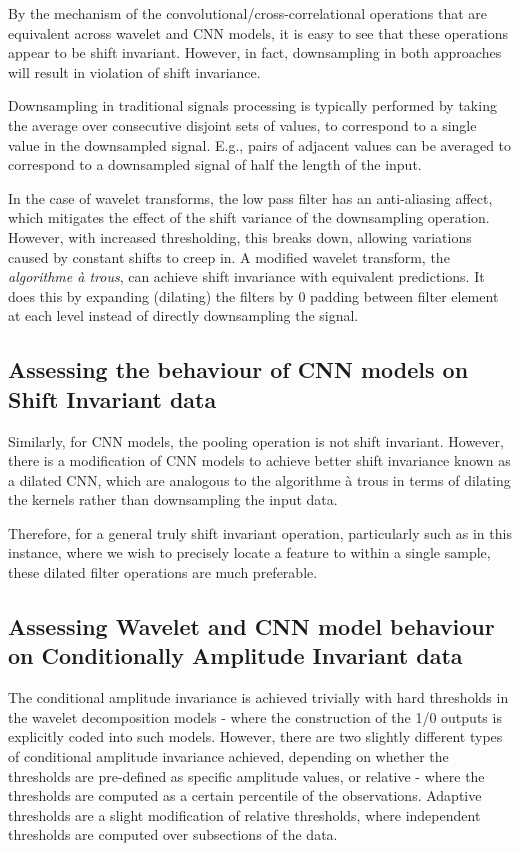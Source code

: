 \documentclass[9pt,conference]{IEEEtran}
\begin{document}
By the mechanism of the convolutional/cross-correlational operations that are equivalent across wavelet and CNN models, it is easy to see that these operations appear to be shift invariant. However, in fact, downsampling in both approaches will result in violation of shift invariance.

Downsampling in traditional signals processing is typically performed by taking the average over consecutive disjoint sets of values, to correspond to a single value in the downsampled signal. E.g., pairs of adjacent values can be averaged to correspond to a downsampled signal of half the length of the input.

In the case of wavelet transforms, the low pass filter has an anti-aliasing affect, which mitigates the effect of the shift variance of the downsampling operation. \cite{bradley2003shift} However, with increased thresholding, this breaks down, allowing variations caused by constant shifts to creep in. A modified wavelet transform, the \textit{algorithme à trous}, can achieve shift invariance with equivalent predictions. It does this by expanding (dilating) the filters by 0 padding between filter element at each level instead of directly downsampling the signal.

\subsection{Assessing the behaviour of CNN models on Shift Invariant data}
Similarly, for CNN models, the pooling operation is not shift invariant. However, there is a modification of CNN models to achieve better shift invariance known as a dilated CNN, which are analogous to the algorithme à trous in terms of dilating the kernels rather than downsampling the input data.

Therefore, for a general truly shift invariant operation, particularly such as in this instance, where we wish to precisely locate a feature to within a single sample, these dilated filter operations are much preferable.

\subsection{Assessing Wavelet and CNN model behaviour on Conditionally Amplitude Invariant data}

The conditional amplitude invariance is achieved trivially with hard thresholds in the wavelet decomposition models - where the construction of the 1/0 outputs is explicitly coded into such models. However, there are two slightly different types of conditional amplitude invariance achieved, depending on whether the thresholds are pre-defined as specific amplitude values, or relative - where the thresholds are computed as a certain percentile of the observations. Adaptive thresholds are a slight modification of relative thresholds, where independent thresholds are computed over subsections of the data.
\end{document}
